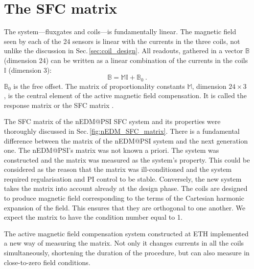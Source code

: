 \section{The SFC matrix}
The system---fluxgates and coils---is fundamentally linear. The magnetic field seen by each of the 24 sensors is linear with the currents in the three coils, not unlike the discussion in Sec.\,\ref{sec:coil_design}. All readouts, gathered in a vector $\mathbb{B}$ (dimension 24) can be written as a linear combination of the currents in the coils $\mathbb{I}$ (dimension 3):
\begin{equation}
  \label{eq:SFC_matrix_model}
  \mathbb{B} = \mathbb{M} \mathbb{I} + \mathbb{B}_0 \ .
\end{equation}
$\mathbb{B}_0$ is the free offset. The matrix of proportionality constants $\mathbb{M}$, dimension $24 \times 3$ , is the central element of the active magnetic field compensation. It is called the response matrix or the SFC matrix . 

The SFC matrix of the nEDM@PSI SFC system and its properties were thoroughly discussed in Sec.\,\ref{fig:nEDM_SFC_matrix}. There is a fundamental difference between the matrix of the nEDM@PSI system and the next generation one. The nEDM@PSI's matrix was not known a priori. The system was constructed and the matrix was measured as the system's property.
This could be considered as the reason that the matrix was ill-conditioned and the system required regularisation and PI control to be stable.
Conversely, the new system takes the matrix into account already at the design phase. The coils are designed to produce magnetic field corresponding to the terms of the Cartesian harmonic expansion of the field.
 This ensures that they are orthogonal to one another. We expect the matrix to have the condition number equal to 1.


The active magnetic field compensation system constructed at ETH implemented a new way of measuring the matrix. Not only it changes currents in all the coils simultaneously, shortening the duration of the procedure, but can also measure in close-to-zero field conditions.

